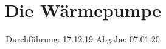 

\subject{V206}
\title{Die Wärmepumpe}
\date{%
  Durchführung: 17.12.19
  \hspace{3em}
  Abgabe: 07.01.20
}



\maketitle
\thispagestyle{empty}
\tableofcontents
\newpage







\printbibliography{}


